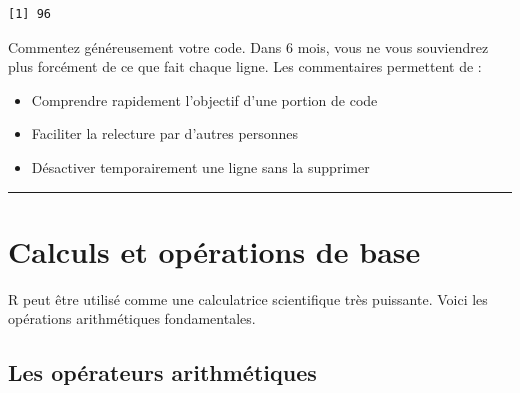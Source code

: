 \documentclass[
  french,
  11pt,
  a4paper,
]{article}
\providecommand{\tightlist}{%
  \setlength{\itemsep}{0pt}\setlength{\parskip}{0pt}}
\begin{document}
\begin{verbatim}
[1] 96
\end{verbatim}

\begin{tcolorbox}[enhanced jigsaw, arc=.35mm, bottomrule=.15mm, bottomtitle=1mm, breakable, colback=white, colbacktitle=quarto-callout-important-color!10!white, colframe=quarto-callout-important-color-frame, coltitle=black, left=2mm, leftrule=.75mm, opacityback=0, opacitybacktitle=0.6, rightrule=.15mm, title=\textcolor{quarto-callout-important-color}{\faExclamation}\hspace{0.5em}{À retenir --- Les commentaires sont indispensables !}, titlerule=0mm, toprule=.15mm, toptitle=1mm]

Commentez généreusement votre code. Dans 6 mois, vous ne vous
souviendrez plus forcément de ce que fait chaque ligne. Les commentaires
permettent de :

\begin{itemize}
\tightlist
\item
  Comprendre rapidement l'objectif d'une portion de code
\item
  Faciliter la relecture par d'autres personnes
\item
  Désactiver temporairement une ligne sans la supprimer
\end{itemize}

\end{tcolorbox}

\begin{center}\rule{0.5\linewidth}{0.5pt}\end{center}

\section{Calculs et opérations de
base}\label{calculs-et-opuxe9rations-de-base}

R peut être utilisé comme une calculatrice scientifique très puissante.
Voici les opérations arithmétiques fondamentales.

\subsection{Les opérateurs
arithmétiques}\label{les-opuxe9rateurs-arithmuxe9tiques}
\end{document}
